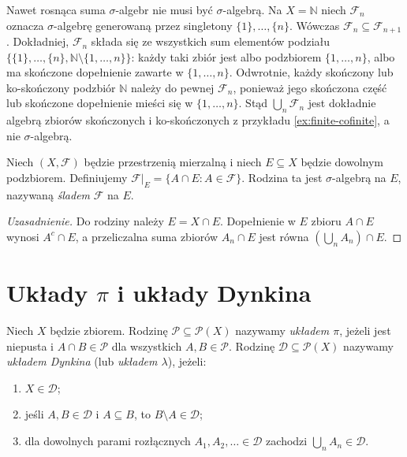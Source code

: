 \begin{uwaga}
Nawet rosnąca suma $\sigma$-algebr nie musi być $\sigma$-algebrą.
Na $X=\mathbb N$ niech $\mathcal F_n$ oznacza $\sigma$-algebrę
generowaną przez singletony $\{1\},\ldots,\{n\}$.
Wówczas $\mathcal F_n\subseteq\mathcal F_{n+1}$. Dokładniej,
$\mathcal F_n$ składa się ze wszystkich sum elementów podziału
$\{\{1\},\ldots,\{n\},\mathbb N\setminus\{1,\ldots,n\}\}$:
każdy taki zbiór jest albo podzbiorem $\{1,\ldots,n\}$,
albo ma skończone dopełnienie zawarte w $\{1,\ldots,n\}$.
Odwrotnie, każdy skończony lub ko-skończony podzbiór $\mathbb N$
należy do pewnej $\mathcal F_n$, ponieważ jego skończona część
lub skończone dopełnienie mieści się w $\{1,\ldots,n\}$.
Stąd $\bigcup_n\mathcal F_n$ jest dokładnie algebrą zbiorów
skończonych i ko-skończonych z przykładu
\ref{ex:finite-cofinite}, a nie $\sigma$-algebrą.
\end{uwaga}

\begin{definicja}\label{idx:01:definicja:04}

Niech $(X,\mathcal F)$ będzie przestrzenią mierzalną i niech
$E\subseteq X$ będzie dowolnym podzbiorem. Definiujemy
$\mathcal F|_E=\{A\cap E:A\in\mathcal F\}$.
Rodzina ta jest $\sigma$-algebrą na $E$, nazywaną \emph{śladem}
$\mathcal F$ na $E$.
\end{definicja}
\begin{proof}[Uzasadnienie]
Do rodziny należy $E=X\cap E$. Dopełnienie w $E$ zbioru $A\cap E$
wynosi $A^c\cap E$, a przeliczalna suma zbiorów $A_n\cap E$ jest równa
$(\bigcup_n A_n)\cap E$.
\end{proof}

\section{Układy \texorpdfstring{$\pi$}{pi} i układy Dynkina}

\begin{definicja}
\label{def:pi-lambda}
Niech $X$ będzie zbiorem. Rodzinę $\mathcal P\subseteq\mathcal P(X)$
nazywamy \emph{układem $\pi$}, jeżeli jest niepusta i
$A\cap B\in\mathcal P$ dla wszystkich $A,B\in\mathcal P$.
Rodzinę $\mathcal D\subseteq\mathcal P(X)$ nazywamy \emph{układem
Dynkina} (lub \emph{układem $\lambda$}), jeżeli:
\begin{enumerate}
\item $X\in\mathcal D$;
\item jeśli $A,B\in\mathcal D$ i $A\subseteq B$, to $B\setminus A\in\mathcal D$;
\item dla dowolnych parami rozłącznych $A_1,A_2,\ldots\in\mathcal D$
zachodzi $\bigcup_nA_n\in\mathcal D$.
\end{enumerate}
\end{definicja}

